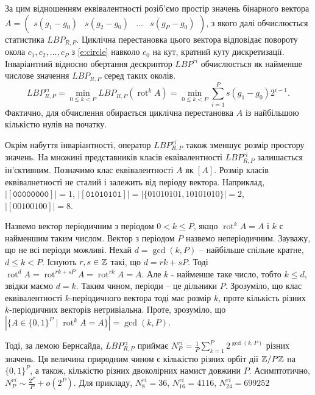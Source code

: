 За цим відношенням еквівалентності розіб'ємо простір значень бінарного вектора $A = \begin{pmatrix}
    s(g_1 - g_0) & s(g_2 - g_0) & ... & s(g_P - g_0)
\end{pmatrix}$, з якого далі обчислюється статистика $LBP_{R,P}$. 
Циклічна перестановка цього вектора відповідає повороту окола $c_1, c_2, ..., c_P$ з \ref{e:circle} навколо $c_0$ на кут, кратний куту дискретизації.
Інваріантний відносно обертання дескриптор $LBP^{ri}$ обчислюється як найменше числове значення $LBP_{R,P}$ серед таких околів.
\begin{equation}
    LBP^{ri}_{R,P} = \min_{0\le k < P} LBP_{R,P} \left( \operatorname{rot}^k A \right) 
    = \min_{0\le k < P} \sum_{i=1}^P s(g_1 - g_0) 2^{i-1}.
\end{equation}
Фактично, для обчислення обирається циклічна перестановка $A$ із найбільшою кількістю нулів на початку.

Окрім набуття інваріантності, оператор $LBP^{ri}_{R,P}$ також зменшує розмір простору значень.
На множині представників класів еквівалентності $LBP^{ri}_{R,P}$ залишається ін'єктивним. 
Позначимо клас еквівалентності $A$ як $[A]$.
Розмір класів еквівалнетності не сталий і залежить від періоду вектора. 
Наприклад, $|[\texttt{00000000}]| = 1$, $|[\texttt{01010101}]| = |\{01010101,10101010\}| = 2$, $|[00100100]| = 8$.

Назвемо вектор періодичним з періодом $0<k\le P$, якщо $\operatorname{rot}^k A = A$ і $k$ є найменшим таким числом.
Вектор з періодом $P$ назвемо неперіодичним.
Зауважу, що не всі періоди можливі. Нехай $d=\operatorname{gcd}(k,P)$ -- найбільше спільне кратне, $d\le k < P$. 
Існують $r,s\in \mathbb Z$ такі, що $d=rk+sP$. Тоді $\operatorname{rot}^d A = \operatorname{rot}^{rk+sP} A = \operatorname{rot}^{rk} A = A$.
Але $k$ - найменше таке число, тобто $k \le d$, звідки маємо $d=k$. Таким чином, періоди -- це дільники $P$.
Зрозуміло, що клас еквівалентності $k$-періодичного вектора тоді має розмір $k$, проте кількість різних $k$-періодичних векторів нетривіальна.
Проте, зрозуміло, що $|\{A\in \{0,1\}^P \mid \operatorname{rot}^k A = A\}| = \operatorname{gcd}(k,P)$.  

Тоді, за лемою Бернсайда, $LBP^{ri}_{R,P}$ приймає $N^{ri}_P = \frac{1}{P}\sum_{k=1}^P 2^{\operatorname{gcd}(k,P)}$ різних значень. 
Ця величина природним чином є кількістю різних орбіт дії $\mathbb Z/P\mathbb Z$ на $\{0,1\}^P$, а також, кількістю різних двоколірних намист довжини $P$.
Асимптотично, $N^{ri}_P \sim \frac{2^P}{P} + o(2^P)$. 
Для прикладу, $N^{ri}_8 = 36$, $N^{ri}_{16} = 4116$, $N^{ri}_{24} = 699252$

